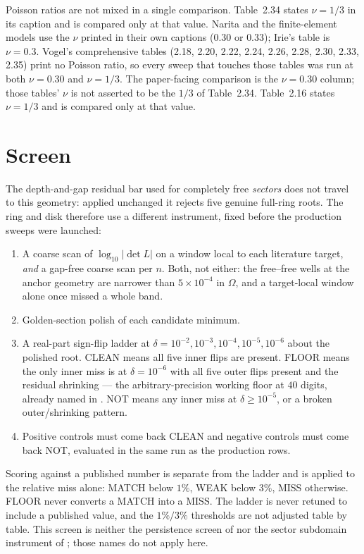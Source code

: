 \documentclass[11pt]{article}
\begin{document}
Poisson ratios are not mixed in a single comparison. Table~2.34 states
$\nu=1/3$ in its caption and is compared only at that value. Narita and the
finite-element models use the $\nu$ printed in their own captions ($0.30$ or
$0.33$); Irie's table is $\nu=0.3$. Vogel's comprehensive tables (2.18, 2.20, 2.22, 2.24, 2.26, 2.28, 2.30,
2.33, 2.35) print no Poisson ratio, so every sweep that touches those
tables was run at both $\nu=0.30$ and $\nu=1/3$. The paper-facing
comparison is the $\nu=0.30$ column; those tables' $\nu$ is not asserted
to be the $1/3$ of Table~2.34. Table~2.16 states $\nu=1/3$ and is
compared only at that value.

\section{Screen}\label{sec:screen}
The depth-and-gap residual bar used for completely free \emph{sectors}
\cite{mccune2026annular} does not travel to this geometry: applied unchanged
it rejects five genuine full-ring roots. The ring and disk therefore use a
different instrument, fixed before the production sweeps were launched:

\begin{enumerate}\itemsep2pt
\item A coarse scan of $\log_{10}|\det L|$ on a window local to each
      literature target, \emph{and} a gap-free coarse scan per $n$. Both, not
      either: the free--free wells at the anchor geometry are narrower than
      $5\times10^{-4}$ in $\Omega$, and a target-local window alone once
      missed a whole band.
\item Golden-section polish of each candidate minimum.
\item A real-part sign-flip ladder at
      $\delta=10^{-2},10^{-3},10^{-4},10^{-5},10^{-6}$ about the polished
      root. CLEAN means all five inner flips are present. FLOOR means the only
      inner miss is at $\delta=10^{-6}$ with all five outer flips present and
      the residual shrinking --- the arbitrary-precision working floor at
      $40$ digits, already named in \cite{mccune2026annular}. NOT means any
      inner miss at $\delta\ge10^{-5}$, or a broken outer/shrinking pattern.
\item Positive controls must come back CLEAN and negative controls must come
      back NOT, evaluated in the same run as the production rows.
\end{enumerate}

Scoring against a published number is separate from the ladder and is applied
to the relative miss alone: MATCH below $1\%$, WEAK below $3\%$, MISS
otherwise. FLOOR never converts a MATCH into a MISS. The ladder is never
retuned to include a published value, and the $1\%/3\%$ thresholds are not
adjusted table by table. This screen is neither the persistence screen of
\cite{mccune2026rect} nor the sector subdomain instrument of
\cite{mccune2026annular}; those names do not apply here.
\end{document}

